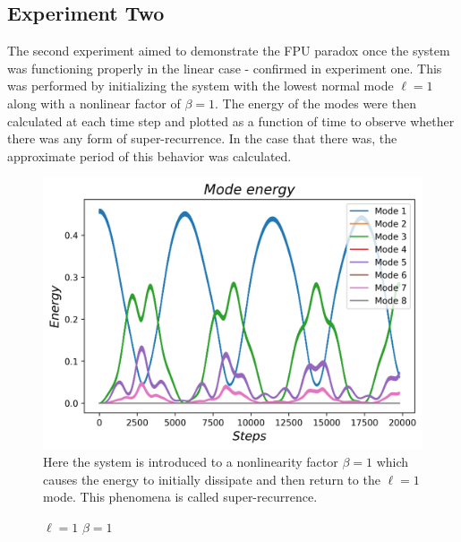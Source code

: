 \documentclass[twocolumn]{article}
\begin{document}
\subsection{Experiment Two}
The second experiment aimed to demonstrate the FPU paradox once the system was functioning properly in the linear case - confirmed in experiment one. This was performed by initializing the system with the lowest normal mode $\ell=1$ along with a nonlinear factor of $\beta=1$. The energy of the modes were then calculated at each time step and plotted as a function of time to observe whether there was any form of super-recurrence. In the case that there was, the approximate period of this behavior was calculated.
\begin{figure}[ht!]
\centering
\caption{$\ell=1$ $\beta=1$}
\includegraphics[scale=.55]{EnergiesN=1B=1}
\small{Here the system is introduced to a nonlinearity factor $\beta=1$ which causes the energy to initially dissipate and then return to the $\ell=1$ mode. This phenomena is called super-recurrence.}
\end{figure}
\end{document}
